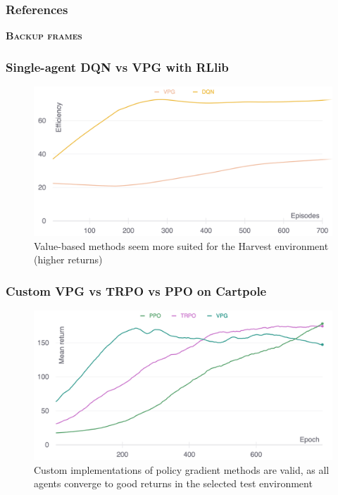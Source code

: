 \documentclass{beamer}
\begin{document}
\begin{frame}
	\frametitle{References}
	\nocite{*}
    
    
\end{frame}

{
  \begin{frame}
    \centering \Large \textbf{\textsc{Backup frames}}
  \end{frame}
}

\begin{frame}
	\frametitle{Single-agent DQN vs VPG with RLlib}
	\begin{figure}
		\centering
		\includegraphics[width=0.9\linewidth]{../assets/dqn-vpg-rllib-single-efficiency.png}
		\caption*{Value-based methods seem more suited for the Harvest environment (higher returns)}
	\end{figure}
\end{frame}

\begin{frame}
	\frametitle{Custom VPG vs TRPO vs PPO on Cartpole}
	\begin{figure}
		\centering
		\includegraphics[width=0.9\linewidth]{../assets/cartpole-pg-return.png}
		\caption*{Custom implementations of policy gradient methods are valid, as all agents converge to good returns in the selected test environment}
	\end{figure}
\end{frame}
\end{document}
